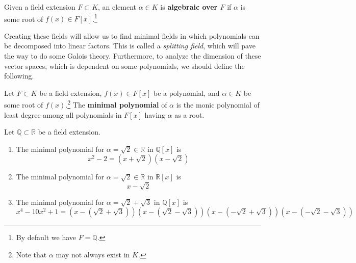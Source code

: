   \begin{definition}
    Given a field extension $F \subset K$, an element $\alpha \in K$ is \textbf{algebraic over $F$} if $\alpha$ is some root of $f(x) \in F[x]$.\footnote{By default we have $F = \mathbb{Q}$.}
  \end{definition}

  Creating these fields will allow us to find minimal fields in which polynomials can be decomposed into linear factors. This is called a \textit{splitting field}, which will pave the way to do some Galois theory. Furthermore, to analyze the dimension of these vector spaces, which is dependent on some polynomials, we should define the following. 

  \begin{definition}
    Let $F \subset K$ be a field extension, $f(x) \in F[x]$ be a polynomial, and $\alpha \in K$ be some root of $f(x)$.\footnote{Note that $\alpha$ may not always exist in $K$.} The \textbf{minimal polynomial} of $\alpha$ is the monic polynomial of least degree among all polynomials in $F[x]$ having $\alpha$ as a root. 
  \end{definition} 

  \begin{example}
    Let $\mathbb{Q} \subset \mathbb{R}$ be a field extension. 
    \begin{enumerate}
      \item The minimal polynomial for $\alpha = \sqrt{2} \in \mathbb{R}$ in $\mathbb{Q}[x]$ is 
      \begin{equation}
        x^2 - 2 = (x + \sqrt{2}) (x - \sqrt{2})
      \end{equation}

      \item The minimal polynomial for $\alpha = \sqrt{2} \in \mathbb{R}$ in $\mathbb{R}[x]$ is 
      \begin{equation}
        x - \sqrt{2}
      \end{equation}

      \item The minimal polynomial for $\alpha = \sqrt{2} + \sqrt{3}$ in $\mathbb{Q}[x]$ is 
      \begin{equation}
        x^4 - 10x^2 + 1 = (x - (\sqrt{2} + \sqrt{3}))(x - (\sqrt{2} - \sqrt{3}))(x - (-\sqrt{2} + \sqrt{3}))(x - (-\sqrt{2} - \sqrt{3}))
      \end{equation}
    \end{enumerate}
  \end{example}


